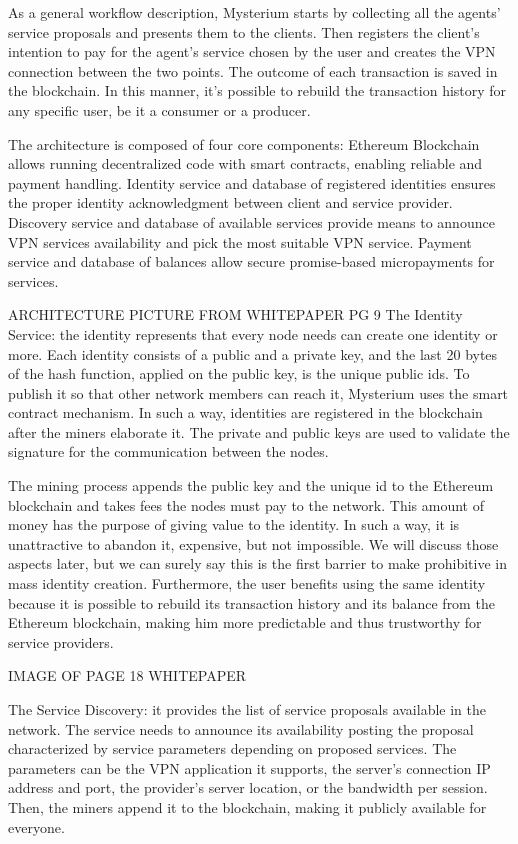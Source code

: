 \documentclass[]{article}
\begin{document}
	As a general workflow description, Mysterium starts by collecting all the agents' service proposals and presents them to the clients. Then registers the client's intention to pay for the agent's service chosen by the user and creates the VPN connection between the two points.
	The outcome of each transaction is saved in the blockchain. In this manner, it's possible to rebuild the transaction history for any specific user, be it a consumer or a producer.
	
	The architecture is composed of four core components:
	Ethereum Blockchain allows running decentralized code with smart contracts, enabling reliable and payment handling.
	Identity service and database of registered identities ensures the proper identity acknowledgment between client and service provider.
	Discovery service and database of available services provide means to announce VPN services availability and pick the most suitable VPN service.
	Payment service and database of balances allow secure promise-based micropayments for services.

	ARCHITECTURE PICTURE FROM WHITEPAPER PG 9
	The Identity Service: the identity represents that every node needs can create one identity or more. Each identity consists of a public and a private key, and the last 20 bytes of the hash function, applied on the public key, is the unique public ids. To publish it so that other network members can reach it, Mysterium uses the smart contract mechanism. In such a way, identities are registered in the blockchain after the miners elaborate it. The private and public keys are used to validate the signature for the communication between the nodes. 

	The mining process appends the public key and the unique id to the Ethereum blockchain and takes fees the nodes must pay to the network. 
	This amount of money has the purpose of giving value to the identity. In such a way, it is unattractive to abandon it, expensive, but not impossible. 
	We will discuss those aspects later, but we can surely say this is the first barrier to make prohibitive in mass identity creation. 
	Furthermore, the user benefits using the same identity because it is possible to rebuild its transaction history and its balance from the Ethereum blockchain, making him more predictable and thus trustworthy for service providers. 


	IMAGE OF PAGE 18 WHITEPAPER

	The Service Discovery: it provides the list of service proposals available in the network. The service needs to announce its availability posting the proposal characterized by service parameters depending on proposed services. The parameters can be the VPN application it supports, the server's connection IP address and port, the provider's server location, or the bandwidth per session. Then, the miners append it to the blockchain, making it publicly available for everyone.
\end{document}
